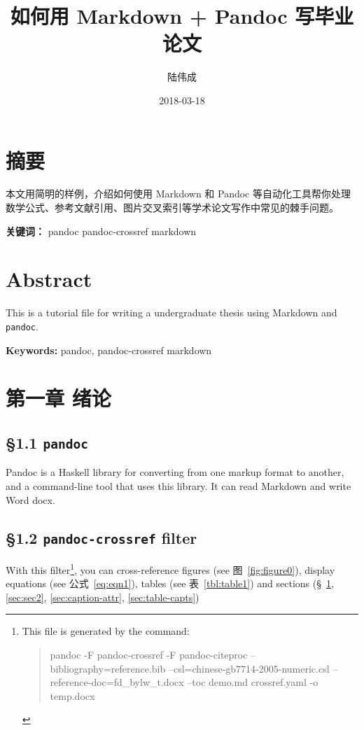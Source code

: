 \documentclass[]{article}
\title{如何用 Markdown + Pandoc 写毕业论文}
\author{陆伟成}
\date{2018-03-18}
\begin{document}
\maketitle

{
\setcounter{tocdepth}{3}
\tableofcontents
}
\hypertarget{sec:ux6458ux8981}{%
\section*{摘要}\label{sec:ux6458ux8981}}

本文用简明的样例，介绍如何使用 Markdown 和 Pandoc
等自动化工具帮你处理数学公式、参考文献引用、图片交叉索引等学术论文写作中常见的棘手问题。

\textbf{关键词：} pandoc pandoc-crossref markdown

\hypertarget{sec:abstract}{%
\section*{Abstract}\label{sec:abstract}}

This is a tutorial file for writing a undergraduate thesis using
Markdown and \texttt{pandoc}.

\textbf{Keywords:} pandoc, pandoc-crossref markdown

\hypertarget{sec:sec1}{%
\section{第一章 绪论}\label{sec:sec1}}

\hypertarget{sec:pandoc}{%
\subsection{\texorpdfstring{§1.1
\texttt{pandoc}}{§1.1 pandoc}}\label{sec:pandoc}}

Pandoc is a Haskell library for converting from one markup format to
another, and a command-line tool that uses this library. It can read
Markdown and write Word docx.

\hypertarget{sec:pandoc-crossref-filter}{%
\subsection{\texorpdfstring{§1.2 \texttt{pandoc-crossref}
filter}{§1.2 pandoc-crossref filter}}\label{sec:pandoc-crossref-filter}}

With this filter\footnote{This file is generated by the command:

  \begin{quote}
  pandoc -F pandoc-crossref -F pandoc-citeproc
  --bibliography=reference.bib --csl=chinese-gb7714-2005-numeric.csl
  --reference-doc=fd\_bylw\_t.docx --toc demo.md crossref.yaml -o
  temp.docx
  \end{quote}}, you can cross-reference figures (see
图~\ref{fig:figure0}), display equations (see 公式~\ref{eq:eqn1}),
tables (see 表~\ref{tbl:table1}) and sections
(§~\ref{sec:sec1}, \ref{sec:sec2}, \ref{sec:caption-attr}, \ref{sec:table-capts})
\end{document}
